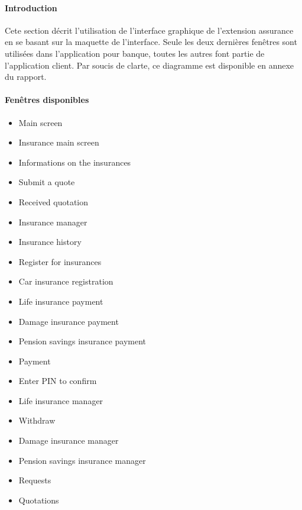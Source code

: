 \paragraph{Introduction}
\noindent
Cete section décrit l'utilisation de l'interface graphique de l'extension assurance en se basant sur la maquette de l'interface. Seule les deux dernières fenêtres sont utilisées dans l'application pour banque, toutes les autres font partie de l'application client. Par soucis de clarte, ce diagramme est disponible en annexe du rapport. \\

\paragraph{Fenêtres disponibles}
\begin{itemize}
\item Main screen
\item Insurance main screen
\item Informations on the insurances
\item Submit a quote
\item Received quotation
\item Insurance manager
\item Insurance history
\item Register for insurances
\item Car insurance registration
\item Life insurance payment
\item Damage insurance payment
\item Pension savings insurance payment
\item Payment
\item Enter PIN to confirm
\item Life insurance manager
\item Withdraw
\item Damage insurance manager
\item Pension savings insurance manager
\item Requests
\item Quotations
\end{itemize}



